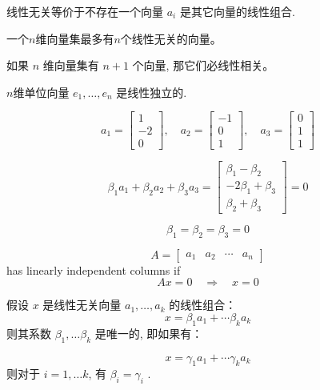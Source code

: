 线性无关等价于不存在一个向量 $ a_{i} $ 是其它向量的线性组合. 

\begin{corollary}
    一个$n$维向量集最多有$n$个线性无关的向量。
\end{corollary}

\begin{corollary}
    如果 $ {n} $ 维向量集有 $ {n}+1 $ 个向量, 那它们必线性相关。
\end{corollary}

\begin{example}
    $n$维单位向量 $ e_{1}, \ldots, e_{n} $ 是线性独立的. 
\end{example}

\begin{example}
    $$ a_{1}=\left[\begin{array}{c}1 \\ -2 \\ 0\end{array}\right], \quad a_{2}=\left[\begin{array}{c}-1 \\ 0 \\ 1\end{array}\right], \quad a_{3}=\left[\begin{array}{l}0 \\ 1 \\ 1\end{array}\right] $$

    $$ \beta_{1} a_{1}+\beta_{2} a_{2}+\beta_{3} a_{3}=\left[\begin{array}{c}\beta_{1}-\beta_{2} \\ -2 \beta_{1}+\beta_{3} \\ \beta_{2}+\beta_{3}\end{array}\right]=0 $$

    $$ \beta_{1}=\beta_{2}=\beta_{3}=0 $$
\end{example}


\begin{corollary}
    $$
A=\left[\begin{array}{llll}
a_{1} & a_{2} & \cdots & a_{n}
\end{array}\right]
$$
has linearly independent columns if
$$
A x=0 \quad \Longrightarrow \quad x=0
$$
\end{corollary}

\begin{theorem}
    假设 $ x $ 是线性无关向量 $ a_{1}, \ldots, a_{k} $ 的线性组合：
$$
x=\beta_{1} a_{1}+\cdots \beta_{k} a_{k}
$$
则其系数 $ \beta_{1}, \ldots \beta_{k} $ 是唯一的, 即如果有：

$$
x=\gamma_{1} a_{1}+\cdots \gamma_{k} a_{k}
$$
则对于 $ i=1, \ldots k $, 有 $ \beta_{i}=\gamma_{i} $ . 
\end{theorem}

